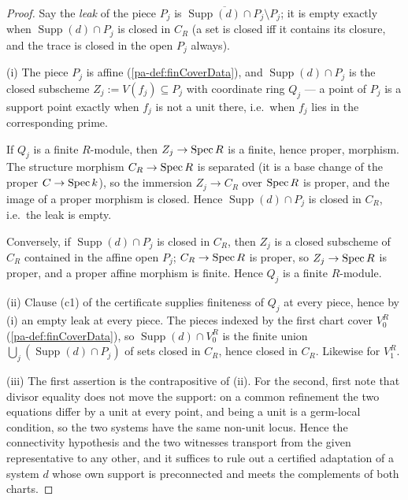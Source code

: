 \begin{proof}
  \leanok
  Say the \emph{leak} of the piece \(P_j\) is
  \(\overline{\operatorname{Supp}(d) \cap P_j} \setminus P_j\); it is empty exactly when
  \(\operatorname{Supp}(d) \cap P_j\) is closed in \(C_R\) (a set is closed iff it contains
  its closure, and the trace is closed in the open \(P_j\) always).

  (i) The piece \(P_j\) is affine (\ref{pa-def:finCoverData}), and
  \(\operatorname{Supp}(d) \cap P_j\) is the closed subscheme \(Z_j := V(f_j) \subseteq
  P_j\) with coordinate ring \(Q_j\) --- a point of \(P_j\) is a support point exactly when
  \(f_j\) is not a unit there, i.e.\ when \(f_j\) lies in the corresponding prime.

  If \(Q_j\) is a finite \(R\)-module, then \(Z_j \to \operatorname{Spec} R\) is a finite, hence proper,
  morphism. The structure morphism \(C_R \to \operatorname{Spec} R\) is separated (it is a base change of
  the proper \(C \to \operatorname{Spec} k\)), so the immersion \(Z_j \to C_R\) over \(\operatorname{Spec} R\) is
  proper, and the image of a proper morphism is closed. Hence
  \(\operatorname{Supp}(d) \cap P_j\) is closed in \(C_R\), i.e.\ the leak is empty.

  Conversely, if \(\operatorname{Supp}(d) \cap P_j\) is closed in \(C_R\), then \(Z_j\) is a
  closed subscheme of \(C_R\) contained in the affine open \(P_j\); \(C_R \to \operatorname{Spec} R\) is
  proper, so \(Z_j \to \operatorname{Spec} R\) is proper, and a proper affine morphism is finite. Hence
  \(Q_j\) is a finite \(R\)-module.

  (ii) Clause (c1) of the certificate supplies finiteness of \(Q_j\) at every piece, hence
  by (i) an empty leak at every piece. The pieces indexed by the first chart cover
  \(V_0^R\) (\ref{pa-def:finCoverData}), so \(\operatorname{Supp}(d) \cap V_0^R\) is the finite
  union \(\bigcup_j (\operatorname{Supp}(d) \cap P_j)\) of sets closed in \(C_R\), hence
  closed in \(C_R\). Likewise for \(V_1^R\).

  (iii) The first assertion is the contrapositive of (ii). For the second, first note that
  divisor equality does not move the support: on a common refinement the two equations
  differ by a unit at every point, and being a unit is a germ-local condition, so the two
  systems have the same non-unit locus. Hence the connectivity hypothesis and the two
  witnesses transport from the given representative to any other, and it suffices to rule
  out a certified adaptation of a system \(d\) whose own support is preconnected and meets
  the complements of both charts.


\end{proof}
